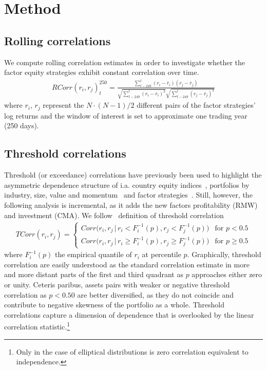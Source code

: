 \section{Method}
\subsection{Rolling correlations}
We compute rolling correlation estimates in order to investigate whether the factor equity strategies exhibit constant correlation over time. 
\begin{align}
    RCorr(r_i, r_j)_t^{250} = \frac{\sum^{t}_{t-249}(r_i - \bar{r}_i)(r_j - \bar{r}_j)}{\sqrt{\sum^{t}_{t-249} (r_i - \bar{r}_i)^2} \sqrt{\sum^{t}_{t-249} (r_j - \bar{r}_j)^2}}
\end{align}
where $r_i$, $r_j$ represent the $N \cdot (N-1) / 2$ different pairs of the factor strategies' log returns and the window of interest is set to approximate one trading year (250 days).
\subsection{Threshold correlations}
Threshold (or exceedance) correlations have previously been used to highlight the asymmetric dependence structure of i.a. country equity indices~\autocite{LonginSolnik2001}, portfolios by industry, size, value and momentum~\autocite{AngChen2002} and factor strategies~\autocite{ChristoffersenLanglois2013}. Still, however, the following analysis is incremental, as it adds the new factors profitability (RMW) and investment (CMA). We follow~\textcite{ChristoffersenLanglois2013} definition of threshold correlation
\begin{align}
    TCorr(r_i, r_j) = 
    \begin{cases} 
        Corr\Big(r_i, r_j \,|\, r_i < F_i^{-1}(p), r_j < F_j^{-1}(p)\Big)  & \text{for } p < 0.5 \\
        Corr\Big(r_i, r_j \,|\, r_i \geq F_i^{-1}(p), r_j \geq F_j^{-1}(p)\Big)  & \text{for } p \geq 0.5
    \end{cases}
\end{align}
where $F_i^{-1}(p)$ the empirical quantile of $r_i$ at percentile $p$. Graphically, threshold correlation are easily understood as the standard correlation estimate in more and more distant parts of the first and third quadrant as $p$ approaches either zero or unity. Ceteris paribus, assets pairs with weaker or negative threshold correlation as $p < 0.50$ are better diversified, as they do not coincide and contribute to negative skewness of the portfolio as a whole. Threshold correlations capture a dimension of dependence that is overlooked by the linear correlation statistic.\footnote{Only in the case of elliptical distributions is zero correlation equivalent to independence.} 
